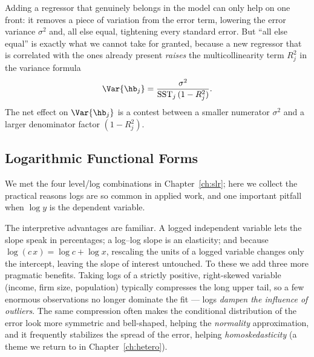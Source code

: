 Adding a regressor that genuinely belongs in the model can only help on one front: it removes a piece of variation from the error term, lowering the error variance $\sigma^2$ and, all else equal, tightening every standard error. But ``all else equal'' is exactly what we cannot take for granted, because a new regressor that is correlated with the ones already present \emph{raises} the multicollinearity term $R_j^2$ in the variance formula
\[
\Var{\hb_j} = \frac{\sigma^2}{\text{SST}_j\,(1-R_j^2)}.
\]
The net effect on $\Var{\hb_j}$ is a contest between a smaller numerator $\sigma^2$ and a larger denominator factor $(1-R_j^2)$.


\subsection{Logarithmic Functional Forms}

We met the four level/log combinations in Chapter~\ref{ch:slr}; here we collect the practical reasons logs are so common in applied work, and one important pitfall when $\log y$ is the dependent variable.

The interpretive advantages are familiar. A logged independent variable lets the slope speak in percentages; a log--log slope is an elasticity; and because $\log(c\,x) = \log c + \log x$, rescaling the units of a logged variable changes only the intercept, leaving the slope of interest untouched. To these we add three more pragmatic benefits. Taking logs of a strictly positive, right-skewed variable (income, firm size, population) typically compresses the long upper tail, so a few enormous observations no longer dominate the fit --- logs \emph{dampen the influence of outliers}. The same compression often makes the conditional distribution of the error look more symmetric and bell-shaped, helping the \emph{normality} approximation, and it frequently stabilizes the spread of the error, helping \emph{homoskedasticity} (a theme we return to in Chapter~\ref{ch:hetero}).

